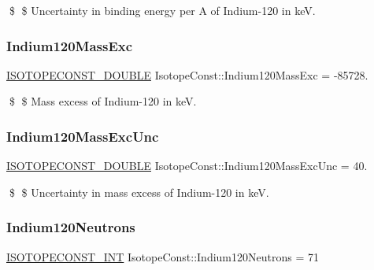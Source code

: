 \$ \$ Uncertainty in binding energy per A of Indium-\/120 in keV. \mbox{\label{group___isotope_const-_indium-_in120_ga4396fea63103db9f6a547a63bfd794fc}} 
\subsubsection{\texorpdfstring{Indium120\+Mass\+Exc}{Indium120MassExc}}
{\footnotesize\ttfamily \mbox{\hyperlink{group___isotope_const-_macros_ga8f45a7272ce02c0b4c65c44636ed719a}{I\+S\+O\+T\+O\+P\+E\+C\+O\+N\+S\+T\+\_\+\+D\+O\+U\+B\+LE}} Isotope\+Const\+::\+Indium120\+Mass\+Exc = -\/85728.}

\$ \$ Mass excess of Indium-\/120 in keV. \mbox{\label{group___isotope_const-_indium-_in120_gae5b7037c8f6a3139bfbd40018dbabdf0}} 
\subsubsection{\texorpdfstring{Indium120\+Mass\+Exc\+Unc}{Indium120MassExcUnc}}
{\footnotesize\ttfamily \mbox{\hyperlink{group___isotope_const-_macros_ga8f45a7272ce02c0b4c65c44636ed719a}{I\+S\+O\+T\+O\+P\+E\+C\+O\+N\+S\+T\+\_\+\+D\+O\+U\+B\+LE}} Isotope\+Const\+::\+Indium120\+Mass\+Exc\+Unc = 40.}

\$ \$ Uncertainty in mass excess of Indium-\/120 in keV. \mbox{\label{group___isotope_const-_indium-_in120_ga0f6f916468e3eb40eadeca0983e40cb9}} 
\subsubsection{\texorpdfstring{Indium120\+Neutrons}{Indium120Neutrons}}
{\footnotesize\ttfamily \mbox{\hyperlink{group___isotope_const-_macros_ga5f18360b3e99483a35c32d789e62621c}{I\+S\+O\+T\+O\+P\+E\+C\+O\+N\+S\+T\+\_\+\+I\+NT}} Isotope\+Const\+::\+Indium120\+Neutrons = 71}

